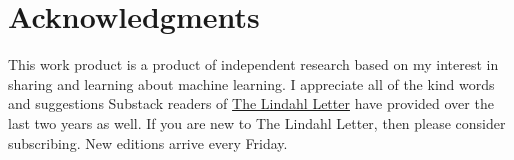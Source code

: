 \documentclass{article}
\begin{document}
\section*{Acknowledgments}
This work product is a product of independent research based on my interest in sharing and learning about machine learning. I appreciate all of the kind words and suggestions Substack readers of \href{https://nelslindahl.substack.com/}{The Lindahl Letter} have provided over the last two years as well. If you are new to The Lindahl Letter, then please consider subscribing. New editions arrive every Friday. 

  
  
\end{document}
